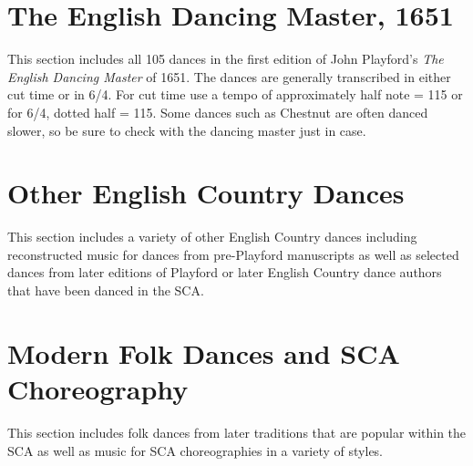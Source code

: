 \documentclass[11pt]{book}
\begin{document}
\clearpage


\chapter{The English Dancing Master, 1651}

This section includes all 105 dances in the first edition of John Playford's
{\em The English Dancing Master} of 1651.  The dances are generally transcribed
in either cut time or in 6/4. For cut time use a tempo of approximately half
note = 115 or for 6/4, dotted half = 115.  Some dances such as Chestnut are
often danced slower, so be sure to check with the dancing master just in case.

\clearpage


\chapter{Other English Country Dances}

This section includes a variety of other English Country dances including
reconstructed music for dances from pre-Playford manuscripts as well as
selected dances from later editions of Playford or later English Country dance
authors that have been danced in the SCA.

\clearpage


\chapter{Modern Folk Dances and SCA Choreography}

This section includes folk dances from later traditions that are popular within
the SCA as well as music for SCA choreographies in a variety of styles.

\clearpage


\clearpage

\printindex
\end{document}
